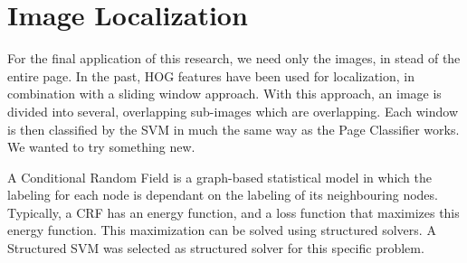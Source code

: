 \section{Image Localization}
\label{sec:imageloc}

For the final application of this research, we need only the images, in stead of
the entire page. In the past, HOG features have been used for localization, in combination
with a sliding window approach\cite{harzallah2009combining,
suard2006pedestrian}. With this approach, an image is divided into several,
overlapping sub-images which are overlapping. Each window is then classified by
the SVM in much the same way as the Page Classifier works. We wanted to try
something new.

A Conditional Random Field \cite{lafferty2001conditional} is a graph-based
statistical model in which the labeling for each node is dependant on the
labeling of its neighbouring nodes. Typically, a CRF has an energy function, and
a loss function that maximizes this energy function. This maximization can be
solved using structured solvers. A Structured SVM \cite{joachims2009cutting} was
selected as structured solver for this specific problem. 




